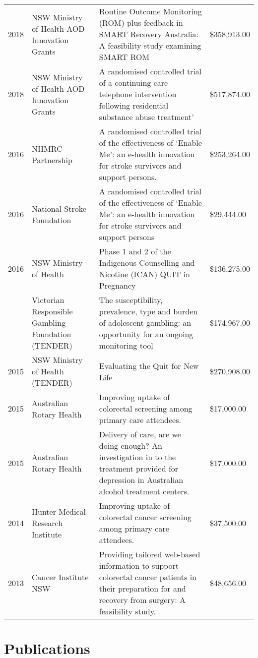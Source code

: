 \documentclass[11pt, a4paper]{awesome-cv}
\begin{document}
\begin{longtable}{r>{\raggedright\arraybackslash}p{15em}>{\raggedright\arraybackslash}p{20em}l}
\addlinespace
\rowcolor{gray!6}  2018 & NSW Ministry of Health AOD Innovation Grants & Routine Outcome Monitoring (ROM) plus feedback in SMART Recovery Australia: A feasibility study examining SMART ROM & \$358,913.00\\
2018 & NSW Ministry of Health AOD Innovation Grants & A randomised controlled trial of a continuing care telephone intervention following residential substance abuse treatment’ & \$517,874.00\\
\rowcolor{gray!6}  2016 & NHMRC Partnership & A randomised controlled trial of the effectiveness of ‘Enable Me’: an e-health innovation for stroke survivors and support persons. & \$253,264.00\\
2016 & National Stroke Foundation & A randomised controlled trial of the effectiveness of ‘Enable Me’: an e-health innovation for stroke survivors and support persons & \$29,444.00\\
\rowcolor{gray!6}  2016 & NSW Ministry of Health & Phase 1 and 2 of the Indigenous Counselling and Nicotine (ICAN) QUIT in Pregnancy & \$136,275.00\\
\addlinespace
2016 & Victorian Responsible Gambling Foundation (TENDER) & The susceptibility, prevalence, type and burden of adolescent gambling: an opportunity for an ongoing monitoring tool & \$174,967.00\\
\rowcolor{gray!6}  2015 & NSW Ministry of Health (TENDER) & Evaluating the Quit for New Life & \$270,908.00\\
2015 & Australian Rotary Health & Improving uptake of colorectal screening among primary care attendees. & \$17,000.00\\
\rowcolor{gray!6}  2015 & Australian Rotary Health & Delivery of care, are we doing enough? An investigation in to the treatment provided for depression in Australian alcohol treatment centers. & \$17,000.00\\
2014 & Hunter Medical Research Institute & Improving uptake of colorectal cancer screening among primary care attendees. & \$37,500.00\\
\addlinespace
\rowcolor{gray!6}  2013 & Cancer Institute NSW & Providing tailored web-based information to support colorectal cancer patients in their preparation for and recovery from surgery: A feasibility study. & \$48,656.00\\
\bottomrule
\end{longtable}

\hypertarget{publications}{%
\section{Publications}\label{publications}}
\end{document}
